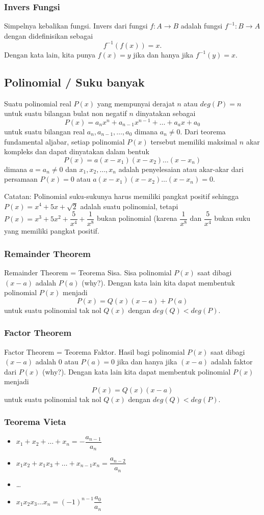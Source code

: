 \subsubsection{Invers Fungsi}
Simpelnya kebalikan fungsi. Invers dari fungsi $f: A \rightarrow B$ adalah fungsi $f^{-1} : B \rightarrow A$ dengan didefinisikan sebagai
$$f^{-1}(f(x))=x.$$
Dengan kata lain, kita punya $f(x)=y$ jika dan hanya jika $f^{-1}(y)=x$.

\subsection{Polinomial / Suku banyak}
Suatu polinomial real $P(x)$ yang mempunyai derajat $n$ atau $deg(P) = n$ untuk suatu bilangan bulat non negatif $n$ dinyatakan sebagai
$$P(x)=a_nx^n+a_{n-1}x^{n-1}+\dots+a_ax+a_0$$
untuk suatu bilangan real $a_n,a_{n-1},\dots,a_0$ dimana $a_n \neq 0$. Dari teorema fundamental aljabar, setiap polinomial $P(x)$ tersebut memiliki maksimal $n$ akar kompleks dan dapat dinyatakan dalam bentuk
$$P(x)=a(x-x_1)(x-x_2)\dots(x-x_n)$$
dimana $a = a_n \neq 0$ dan $x_1,x_2,\dots,x_n$ adalah penyelesaian atau akar-akar dari persamaan $P(x)=0$ atau $a(x-x_1)(x-x_2)\dots(x-x_n)=0$.

Catatan: Polinomial suku-sukunya harus memiliki pangkat positif sehingga $P(x)=x^4+5x+\sqrt{2}$ adalah suatu polinomial, tetapi $P(x)=x^3+5x^2+\dfrac{5}{x^4}+\dfrac{1}{x^8}$ bukan polinomial (karena $\dfrac{1}{x^8}$ dan $\dfrac{5}{x^4}$ bukan suku yang memiliki pangkat positif.

\subsubsection{Remainder Theorem}
Remainder Theorem = Teorema Sisa.
Sisa polinomial $P(x)$ saat dibagi $(x-a)$ adalah $P(a)$ (why?).
Dengan kata lain kita dapat membentuk polinomial $P(x)$ menjadi
$$P(x)=Q(x)(x-a)+P(a)$$
untuk suatu polinomial tak nol $Q(x)$ dengan $deg(Q)<deg(P)$.
\subsubsection{Factor Theorem}
Factor Theorem = Teorema Faktor.
Hasil bagi polinomial $P(x)$ saat dibagi $(x-a)$ adalah $0$ atau $P(a)=0$ jika dan hanya jika $(x-a)$ adalah faktor dari $P(x)$ (why?).
Dengan kata lain kita dapat membentuk polinomial $P(x)$ menjadi
$$P(x)=Q(x)(x-a)$$
untuk suatu polinomial tak nol $Q(x)$ dengan $deg(Q)<deg(P)$.
\subsubsection{Teorema Vieta}
\begin{itemize}
    \item $x_1+x_2+\dots+x_n=-\dfrac{a_{n-1}}{a_n}$
    \item $x_1x_2+x_1x_3+\dots+x_{n-1}x_n=\dfrac{a_{n-2}}{a_n}$
    \item \dots
    \item $x_1x_2x_3\ldots x_n = (-1)^{n-1}\dfrac{a_{0}}{a_n}$
\end{itemize}

